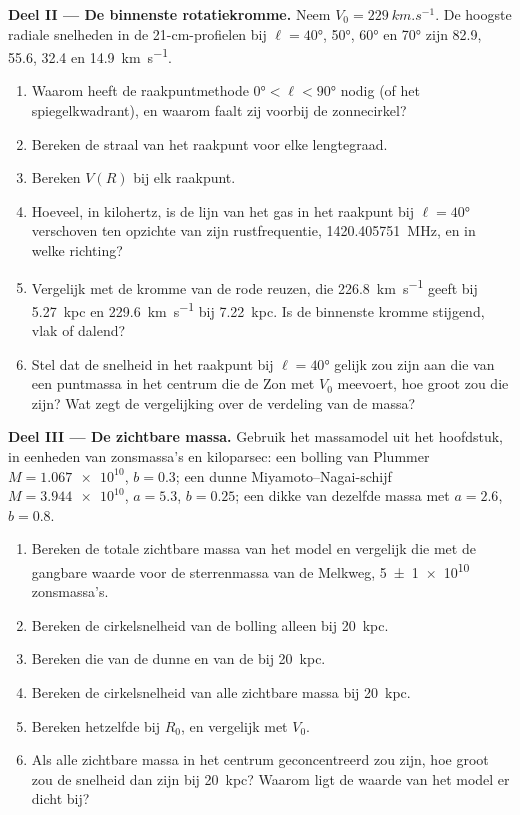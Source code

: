 \begin{problem}
\medskip\noindent\textbf{Deel II --- De binnenste rotatiekromme.} Neem
$V_0 = \qty{229}{km.s^{-1}}$. De hoogste radiale snelheden in de
21-cm-profielen bij $\ell = \ang{40}$, \ang{50}, \ang{60} en \ang{70} zijn
82.9, 55.6, 32.4 en \qty{14.9}{km.s^{-1}}.
\begin{enumerate}[resume]
\item Waarom heeft de raakpuntmethode $\ang{0} < \ell < \ang{90}$ nodig
  (of het spiegelkwadrant), en waarom faalt zij voorbij de zonnecirkel?
\item Bereken de straal van het raakpunt voor elke lengtegraad.
\item Bereken $V(R)$ bij elk raakpunt.
\item Hoeveel, in kilohertz, is de lijn van het gas in het raakpunt
  bij $\ell = \ang{40}$ verschoven ten opzichte van zijn rustfrequentie,
  \qty{1420.405751}{MHz}, en in welke richting?
\item Vergelijk met de kromme van de rode reuzen, die \qty{226.8}{km.s^{-1}}
  geeft bij \qty{5.27}{kpc} en \qty{229.6}{km.s^{-1}} bij \qty{7.22}{kpc}. Is de
  binnenste kromme stijgend, vlak of dalend?
\item Stel dat de snelheid in het raakpunt bij $\ell = \ang{40}$ gelijk zou zijn aan die van
  een puntmassa in het centrum die de Zon met $V_0$ meevoert, hoe groot zou die zijn?
  Wat zegt de vergelijking over de verdeling van de massa?
\end{enumerate}

\medskip\noindent\textbf{Deel III --- De zichtbare massa.} Gebruik het massamodel
uit het hoofdstuk, in eenheden van zonsmassa's en kiloparsec: een
bolling van Plummer $M = \num{1.067e10}$, $b = 0.3$; een dunne Miyamoto--Nagai-schijf
$M = \num{3.944e10}$, $a = 5.3$, $b = 0.25$; een dikke van dezelfde
massa met $a = 2.6$, $b = 0.8$.
\begin{enumerate}[resume]
\item Bereken de totale zichtbare massa van het model en vergelijk die met de
  gangbare waarde voor de sterrenmassa van de Melkweg, \qty[separate-uncertainty=true]{5 \pm 1 e10}{}
  zonsmassa's.
\item Bereken de cirkelsnelheid van de bolling alleen bij \qty{20}{kpc}.
\item Bereken die van de dunne en van de  bij \qty{20}{kpc}.
\item Bereken de cirkelsnelheid van alle zichtbare massa bij
  \qty{20}{kpc}.
\item Bereken hetzelfde bij $R_0$, en vergelijk met $V_0$.
\item Als alle zichtbare massa in het centrum geconcentreerd zou zijn, hoe groot zou
  de snelheid dan zijn bij \qty{20}{kpc}? Waarom ligt de waarde van het model er dicht bij?
\end{enumerate}


\end{problem}
